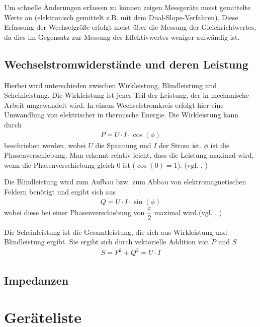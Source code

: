 \documentclass{article}
\begin{document}
Um schnelle Änderungen erfassen zu können zeigen Messgeräte meist gemittelte Werte an (elektronisch gemittelt z.B. mit dem Dual-Slope-Verfahren). Diese Erfassung der Wechselgröße erfolgt meist über die Messung der Gleichrichtwertes, da dies im Gegensatz zur Messung des Effektivwertes weniger aufwändig ist.



\subsection{Wechselstromwiderstände und deren Leistung}

Hierbei wird unterschieden zwischen Wirkleistung, Blindleistung und Scheinleistung. Die Wirkleistung ist jener Teil der Leistung, der in mechanische Arbeit umgewandelt wird. In einem Wechselstromkreis erfolgt hier eine Umwandlung von elektrischer in thermische Energie. Die Wirkleistung kann durch
\begin{align}
P = U\cdot I \cdot \cos(\phi)
\end{align}
beschrieben werden, wobei $U$ die Spannung und $I$ der Strom ist. $\phi$ ist die Phasenverschiebung. Man erkennt relativ leicht, dass die Leistung maximal wird, wenn die Phasenverschiebung gleich 0 ist ($\cos(0)=1$). (vgl. \cite{moodle}, \cite{src6})


Die Blindleistung wird zum Aufbau bzw. zum Abbau von elektromagnetischen Feldern benötigt und ergibt sich aus
\begin{align}
Q = U\cdot I \cdot \sin	(\phi)
\end{align}
wobei diese bei einer Phasenverschiebung von $\dfrac{\pi}{2}$ maximal wird.(vgl. \cite{moodle}, \cite{src6})


Die Scheinleistung ist die Gesamtleistung, die sich aus Wirkleistung und Blindleistung ergibt. Sie ergibt sich durch vektorielle Addition von $P$ und $S$
\begin{align}
S = P^2 + Q^2 = U\cdot I 
\end{align}


\subsection{Impedanzen}




\section{Geräteliste}
\end{document}
